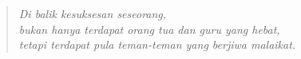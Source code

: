 \chapter*{}


\vspace{5cm}

\begin{quote}
\begin{center}
\textit{Di balik kesuksesan seseorang, \\
bukan hanya terdapat orang tua dan guru yang hebat, \\
tetapi terdapat pula teman-teman yang berjiwa malaikat. }
\end{center}
\end{quote}



